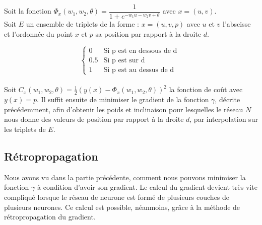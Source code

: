 \documentclass{article}
\begin{document}
Soit la fonction $\Phi_{x}(w_{1},w_{2},\theta)= \dfrac{1}{1+e^{-w_{1}u-w_{2}v+\theta}}$ avec $x=(u,v)$.\\

Soit $E$ un ensemble de triplets de la forme : 
$x = (u,v,p)$ 	avec $u$ et $v$ l'abscisse et l'ordonnée du point $x$ et $p$ sa position par rapport à la droite $d$.

	\[ \begin{cases} 0 &\mbox{Si  p est en dessous de d } \\
				 0.5 & \mbox{Si p est sur d } \\
				 1 & \mbox{Si p est au dessus de d }
	 		 \end{cases} \] \\
	 		 
Soit $ C_x(w_{1},w_{2},\theta) = \frac{1}{2}(y(x)-\Phi_x(w_{1},w_{2},\theta))^{2} $ la fonction de coût avec $y(x)=p$. Il suffit ensuite de minimiser le gradient de la fonction $\gamma$, décrite précédemment, afin d'obtenir les poids et inclinaison pour lesquelles le réseau $N$ nous donne des valeurs de position par rapport à la droite $d$, par interpolation sur les triplets de $E$.\\
\newline

\subsection{Rétropropagation}
Nous avons vu dans la partie précédente, comment nous pouvons minimiser la fonction $\gamma$ à condition d'avoir son gradient. Le calcul du gradient devient très vite compliqué lorsque le réseau de neurone est formé de plusieurs couches de plusieurs neurones. Ce calcul est possible, néanmoins, grâce à la méthode de rétropropagation du gradient.
\end{document}
